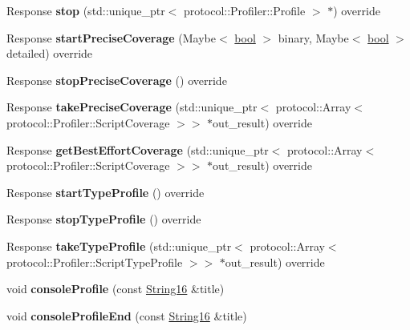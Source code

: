 \begin{DoxyCompactItemize}
Response {\bfseries stop} (std\+::unique\+\_\+ptr$<$ protocol\+::\+Profiler\+::\+Profile $>$ $\ast$) override
\item 
\mbox{\label{classv8__inspector_1_1V8ProfilerAgentImpl_a352e105a6e08f0cba382b0c431eb47f7}} 
Response {\bfseries start\+Precise\+Coverage} (Maybe$<$ \mbox{\hyperlink{classbool}{bool}} $>$ binary, Maybe$<$ \mbox{\hyperlink{classbool}{bool}} $>$ detailed) override
\item 
\mbox{\label{classv8__inspector_1_1V8ProfilerAgentImpl_a230e48301429fc00ba4b8ac75f28409e}} 
Response {\bfseries stop\+Precise\+Coverage} () override
\item 
\mbox{\label{classv8__inspector_1_1V8ProfilerAgentImpl_ab6ccf72fe2ba7c352e12fdd5e0ed8025}} 
Response {\bfseries take\+Precise\+Coverage} (std\+::unique\+\_\+ptr$<$ protocol\+::\+Array$<$ protocol\+::\+Profiler\+::\+Script\+Coverage $>$$>$ $\ast$out\+\_\+result) override
\item 
\mbox{\label{classv8__inspector_1_1V8ProfilerAgentImpl_ab7b75f2d8cd96538dd18024f8f1b4c5c}} 
Response {\bfseries get\+Best\+Effort\+Coverage} (std\+::unique\+\_\+ptr$<$ protocol\+::\+Array$<$ protocol\+::\+Profiler\+::\+Script\+Coverage $>$$>$ $\ast$out\+\_\+result) override
\item 
\mbox{\label{classv8__inspector_1_1V8ProfilerAgentImpl_a93dcad27dbbe5350c2e5f02c791bb735}} 
Response {\bfseries start\+Type\+Profile} () override
\item 
\mbox{\label{classv8__inspector_1_1V8ProfilerAgentImpl_a43562e2121d9c93761920373fe48fbb7}} 
Response {\bfseries stop\+Type\+Profile} () override
\item 
\mbox{\label{classv8__inspector_1_1V8ProfilerAgentImpl_a9f8cd259ce7bb4af80eaba7c047e5cb8}} 
Response {\bfseries take\+Type\+Profile} (std\+::unique\+\_\+ptr$<$ protocol\+::\+Array$<$ protocol\+::\+Profiler\+::\+Script\+Type\+Profile $>$$>$ $\ast$out\+\_\+result) override
\item 
\mbox{\label{classv8__inspector_1_1V8ProfilerAgentImpl_a43201f3bfcb2399ae62717d2b15cbc10}} 
void {\bfseries console\+Profile} (const \mbox{\hyperlink{classv8__inspector_1_1String16}{String16}} \&title)
\item 
\mbox{\label{classv8__inspector_1_1V8ProfilerAgentImpl_af389935ae2baccabef3b9bea8f1421ec}} 
void {\bfseries console\+Profile\+End} (const \mbox{\hyperlink{classv8__inspector_1_1String16}{String16}} \&title)
\end{DoxyCompactItemize}



